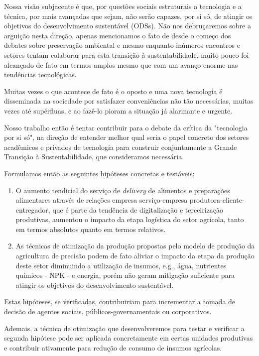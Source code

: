 \documentclass[14pt,a4paper]{article}
\begin{document}
		Nossa visão subjacente é que, por questões sociais estruturais a tecnologia e a técnica, por mais avançadas que sejam, não serão capazes, por si só, de atingir os objetivos do desenvolvimento sustentável (ODSs). Não nos debruçaremos sobre a arguição nesta direção, apenas mencionamos o fato de desde o começo dos debates sobre preservação ambiental e mesmo enquanto inúmeros encontros e setores tentam colaborar para esta transição à sustentabilidade, muito pouco foi alcançado de fato em termos amplos mesmo que com um avanço enorme nas tendências tecnológicas. 
		
		Muitas vezes o que acontece de fato é o oposto e uma nova tecnologia é disseminada na sociedade por satisfazer conveniências não tão necessárias, muitas vezes até supérfluas, e ao fazê-lo pioram a situação já alarmante e urgente.
		
		Nosso trabalho então é tentar contribuir para o debate da crítica da "tecnologia por si só", na direção de entender melhor qual seria o papel concreto dos setores acadêmicos e privados de tecnologia para construir conjuntamente a Grande Transição à Sustentabilidade, que consideramos necessária. 
		
		Formulamos então as seguintes hipóteses concretas e testáveis:
		
	\begin{enumerate}
		\item O aumento tendicial do serviço de \textit{delivery} de alimentos e preparações alimentares através de relações empresa serviço-empresa produtora-cliente-entregador, que é parte da tendência de digitalização e terceirização produtivas, aumentou o impacto da etapa logística do setor agrícola, tanto em termos absolutos quanto em termos relativos.
		
		\item As técnicas de otimização da produção propostas pelo modelo de produção da agricultura de precisão podem de fato aliviar o impacto da etapa da produção deste setor diminuindo a utilização de insumos, e.g., água, nutrientes químicos - NPK - e energia, porém não geram mitigação suficiente para atingir os objetivos do desenvolvimento sustentável. 
	\end{enumerate}

	Estas hipóteses, se verificadas, contribuiriam para incrementar a tomada de decisão de agentes sociais, públicos-governamentais ou corporativos.
	
	
	Ademais, a técnica de otimização que desenvolveremos para testar e verificar a segunda hipótese pode ser aplicada concretamente em certas unidades produtivas e contribuir ativamente para redução de consumo de insumos agrícolas. 
\end{document}
